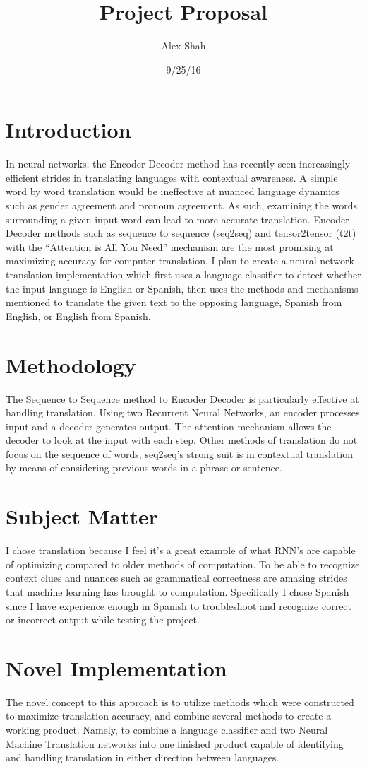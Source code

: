 \documentclass[10pt,a4paper]{report}
\begin{document}
\title{Project Proposal}
\author{Alex Shah}
\date{9/25/16}
\maketitle

\section{Introduction}
In neural networks, the Encoder Decoder method has recently seen increasingly efficient strides in translating languages with contextual awareness. A simple word by word translation would be ineffective at nuanced language dynamics such as gender agreement and pronoun agreement. As such, examining the words surrounding a given input word can lead to more accurate translation. Encoder Decoder methods such as sequence to sequence (seq2seq) and tensor2tensor (t2t) with the “Attention is All You Need” mechanism are the most promising at maximizing accuracy for computer translation. I plan to create a neural network translation implementation which first uses a language classifier to detect whether the input language is English or Spanish, then uses the methods and mechanisms mentioned to translate the given text to the opposing language, Spanish from English, or English from Spanish.

\section{Methodology}
The Sequence to Sequence method to Encoder Decoder is particularly effective at handling translation. Using two Recurrent Neural Networks, an encoder processes input and a decoder generates output. The attention mechanism allows the decoder to look at the input with each step. Other methods of translation do not focus on the sequence of words, seq2seq’s strong suit is in contextual translation by means of considering previous words in a phrase or sentence.

\section{Subject Matter}
I chose translation because I feel it’s a great example of what RNN’s are capable of optimizing compared to older methods of computation. To be able to recognize context clues and nuances such as grammatical correctness are amazing strides that machine learning has brought to computation. Specifically I chose Spanish since I have experience enough in Spanish to troubleshoot and recognize correct or incorrect output while testing the project.

\section{Novel Implementation}
The novel concept to this approach is to utilize methods which were constructed to maximize translation accuracy, and combine several methods to create a working product. Namely, to combine a language classifier and two Neural Machine Translation networks into one finished product capable of identifying and handling translation in either direction between languages.
\end{document}
